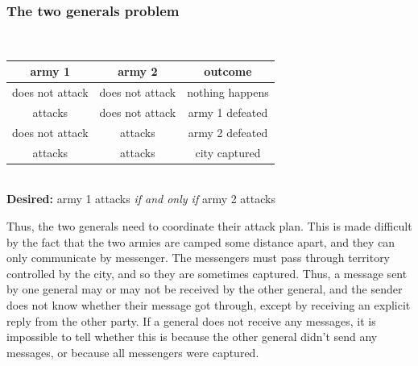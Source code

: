 \begin{frame}
    \label{s:two-generals}
    \frametitle{The two generals problem}
    \begin{center}
        \\[1em]\pause
        \renewcommand{\arraystretch}{1.3}
        \begin{tabular}{c|c|c}
            \hline
            army 1 & army 2 & outcome \\\hline
            does not attack & does not attack & nothing happens \\
            attacks & does not attack & army 1 defeated \\
            does not attack & attacks & army 2 defeated \\
            attacks & attacks & city captured \\\hline
        \end{tabular}\\[1em]
        \textbf{Desired:} army 1 attacks \emph{if and only if} army 2 attacks
    \end{center}
\end{frame}
\label{l:two-generals}

Thus, the two generals need to coordinate their attack plan.
This is made difficult by the fact that the two armies are camped some distance apart, and they can only communicate by messenger.
The messengers must pass through territory controlled by the city, and so they are sometimes captured.
Thus, a message sent by one general may or may not be received by the other general, and the sender does not know whether their message got through, except by receiving an explicit reply from the other party.
If a general does not receive any messages, it is impossible to tell whether this is because the other general didn't send any messages, or because all messengers were captured.

